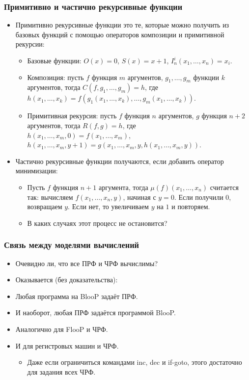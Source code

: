 \documentclass[10pt]{beamer}
\begin{document}
\begin{frame}
    \frametitle{Примитивно и частично рекурсивные функции}
    \begin{itemize}
        \item Примитивно рекурсивные функции это те, которые можно получить из базовых функций с помощью операторов композиции и примитивной рекурсии:
        \begin{itemize}
            \item Базовые функции: $O(x) = 0$, $S(x) = x+1$, $I_n^i(x_1, \ldots, x_n) = x_i$.
            \item Композиция: пусть $f$ функция $m$ аргументов, $g_1, \ldots, g_m$ функции $k$ аргументов, тогда $C(f, g_1, \ldots, g_m) = h$, где \\ $h(x_1, \ldots, x_k) = f(g_1(x_1, \ldots, x_k), \ldots, g_m(x_1, \ldots, x_k))$.
            \item Примитивная рекурсия: пусть $f$ функция $n$ аргументов, $g$ функция $n+2$ аргументов, тогда $R(f,g)=h$, где \\
            $h(x_1, \ldots, x_m,0) = f(x_1, \ldots, x_m)$, \\
            $h(x_1, \ldots, x_m,y+1) = g(x_1, \ldots, x_m, y, h(x_1, \ldots, x_m, y))$.
        \end{itemize}
        \pause
        \item Частично рекурсивные функции получаются, если добавить оператор минимизации:
        \begin{itemize}
            \item Пусть $f$ функция $n+1$ аргумента, тогда $\mu(f)(x_1, \ldots, x_n)$ считается так: вычисляем $f(x_1, \ldots, x_n, y)$, начиная с $y=0$. Если получили $0$, возвращаем $y$. Если нет, то увеличиваем $y$ на $1$ и повторяем.
            \item В каких случаях этот процесс не остановится?
        \end{itemize}
    \end{itemize}
\end{frame}

\begin{frame}
    \frametitle{Связь между моделями вычислений}
    \begin{itemize}
        \item Очевидно ли, что все ПРФ и ЧРФ вычислимы?
        \pause
        \item Оказывается (без доказательства):
        \item Любая программа на BlooP задаёт ПРФ.
        \item И наоборот, любая ПРФ задаётся программой BlooP.
        \pause
        \item Аналогично для FlooP и ЧРФ.
        \item И для регистровых машин и ЧРФ.
        \begin{itemize}
            \item Даже если ограничиться командами inc, dec и if-goto, этого достаточно для задания всех ЧРФ.
        \end{itemize}
    \end{itemize}
\end{frame}
\end{document}
